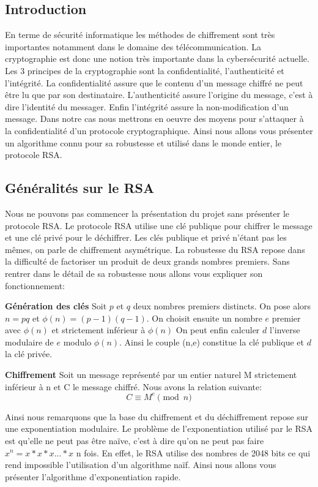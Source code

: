 \subsection{Introduction}
En terme de sécurité informatique les méthodes de chiffrement sont très importantes notamment dans le domaine des télécommunication. La cryptographie est donc une notion très importante dans la cybersécurité actuelle. Les 3 principes de la cryptographie sont la confidentialité, l'authenticité et l'intégrité.
La confidentialité assure que le contenu d'un message chiffré ne peut être lu que par son destinataire.
L'authenticité assure l'origine du message, c'est à dire l'identité du messager.
Enfin l'intégrité assure la non-modification d'un message.
Dans notre cas nous mettrons en oeuvre des moyens pour s'attaquer à la confidentialité d'un protocole cryptographique. 
Ainsi nous allons vous présenter un algorithme connu pour sa robustesse et utilisé dans le monde entier, le protocole RSA.
\newpage
\subsection{Généralités sur le RSA}
Nous ne pouvons pas commencer la présentation du projet sans présenter le protocole RSA.
Le protocole RSA utilise une clé publique pour chiffrer le message et une clé privé pour le déchiffrer. Les clés publique et privé n'étant pas les mêmes, on parle de chiffrement asymétrique.
La robustesse du RSA repose dans la difficulté de factoriser un produit de deux grands nombres premiers.
Sans rentrer dans le détail de sa robustesse nous allons vous expliquer son fonctionnement:


\textbf{Génération des clés}
Soit $p$ et $q$ deux nombres premiers distincts. On pose alors $n=pq$ et $\phi(n)=(p-1)(q-1)$.
On choisit ensuite un nombre $e$ premier avec $\phi(n)$ et strictement inférieur à $\phi(n)$
On peut enfin calculer $d$ l'inverse modulaire de $e$ modulo $\phi(n)$.
Ainsi le couple (n,e) constitue la clé publique et $d$ la clé privée.


\textbf{Chiffrement}
Soit un message représenté par un entier naturel M strictement inférieur à n et C le message chiffré.
Nous avons la relation suivante:
\[
C \equiv M^e \pmod{n}
\]

Ainsi nous remarquons que la base du chiffrement et du déchiffrement repose sur une exponentiation modulaire. Le problème de l'exponentiation utilisé par le RSA est qu'elle ne peut pas être naïve, c'est à dire qu'on ne peut pas faire $ x^n = x*x*x...*x$ n fois. En effet, le RSA utilise des nombres de 2048 bits ce qui rend impossible l'utilisation d'un algorithme naïf.
Ainsi nous allons vous présenter l'algorithme d'exponentiation rapide.
